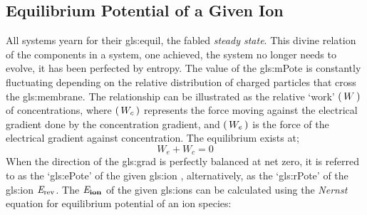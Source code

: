 \documentclass[class={myRUCProject}, crop=false]{standalone}
\begin{document}
\subsection{Equilibrium Potential of a Given Ion}
\begingroup
\allowdisplaybreaks
All systems yearn for their \gls{gls:equil}, the fabled \textit{steady state}. This divine relation of the components in a system, one achieved, the system no longer needs to evolve, it has been perfected by entropy. 
The value of the \gls{gls:mPote} is constantly fluctuating depending on the relative distribution of charged particles that cross the \gls{gls:membrane}. The relationship can be illustrated as the relative `work' \(\left(\,W\,\right)\) of concentrations, where  \(\left(\,W_c\,\right)\) represents the force moving against the electrical gradient done by the concentration gradient, and \(\left(\,W_e\,\right)\) is the force of the electrical gradient against concentration. The equilibrium exists at;
\begin{equation}
    W_e + W_c = 0
\end{equation}
When the direction of the \gls{gls:grad} is perfectly balanced at net zero, it is referred to as the `\gls{gls:ePote}' of the given \gls{gls:ion} \br{\equi\ion}, alternatively, as the `\gls{gls:rPote}' of the \gls{gls:ion} \(\mathit{E}_\mathrm{rev}\). 
The \(\mathit{E}_\mathbf{ion}\) of the given \glspl{gls:ion} can be calculated using the \emph{Nernst} equation for equilibrium potential of an ion species:
\end{document}
